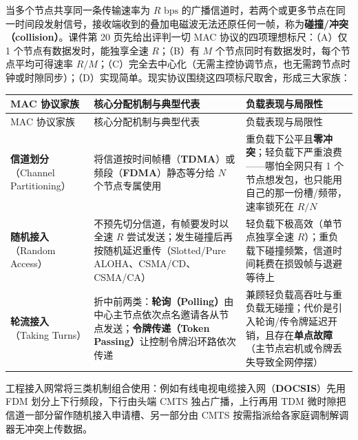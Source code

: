 
当多个节点共享同一条传输速率为 $R\text{ bps}$ 的广播信道时，若两个或更多节点在同一时间段发射信号，接收端收到的叠加电磁波无法还原任何一帧，称为\textbf{碰撞/冲突（collision）}。课件第 20 页先给出评判一切 MAC 协议的四项理想标尺：（A）仅 1 个节点有数据发时，能独享全速 $R$；（B）有 $M$ 个节点同时有数据发时，每个节点平均可得速率 $R/M$；（C）完全去中心化（无需主控协调节点，也无需跨节点时钟或时隙同步）；（D）实现简单。现实协议围绕这四项标尺取舍，形成三大家族：

\begingroup\small\setlength{\tabcolsep}{3pt}\renewcommand{\arraystretch}{1.22}
\begin{longtable}{@{}>{\raggedright\arraybackslash}p{}>{\raggedright\arraybackslash}p{}>{\raggedright\arraybackslash}p{}@{}}
\toprule
MAC 协议家族 & 核心分配机制与典型代表 & 负载表现与局限性 \\
\midrule\endfirsthead
MAC 协议家族 & 核心分配机制与典型代表 & 负载表现与局限性 \\
\midrule\endhead
\bottomrule\endfoot
\textbf{信道划分}（Channel Partitioning） & 将信道按时间帧槽（\textbf{TDMA}）或频段（\textbf{FDMA}）静态等分给 $N$ 个节点专属使用 & 重负载下公平且\textbf{零冲突}；轻负载下严重浪费——哪怕全网只有 1 个节点想发包，也只能用自己的那一份槽/频带，速率锁死在 $R/N$ \\
\textbf{随机接入}（Random Access） & 不预先切分信道，有帧要发时以全速 $R$ 尝试发送；发生碰撞后再按随机延迟重传（Slotted/Pure ALOHA、CSMA/CD、CSMA/CA） & 轻负载下极高效（单节点独享全速 $R$）；重负载下碰撞频繁，信道时间耗费在损毁帧与退避等待上 \\
\textbf{轮流接入}（Taking Turns） & 折中前两类：\textbf{轮询（Polling）}由中心主节点依次点名邀请各从节点发送；\textbf{令牌传递（Token Passing）}让控制令牌沿环路依次传递 & 兼顾轻负载高吞吐与重负载无碰撞；代价是引入轮询/传令牌延迟开销，且存在\textbf{单点故障}（主节点宕机或令牌丢失导致全网停摆） \\
\end{longtable}\endgroup

工程接入网常将三类机制组合使用：例如有线电视电缆接入网（\textbf{DOCSIS}）先用 FDM 划分上下行频段，下行由头端 CMTS 独占广播，上行再用 TDM 微时隙把信道一部分留作随机接入申请槽、另一部分由 CMTS 按需指派给各家庭调制解调器无冲突上传数据。

